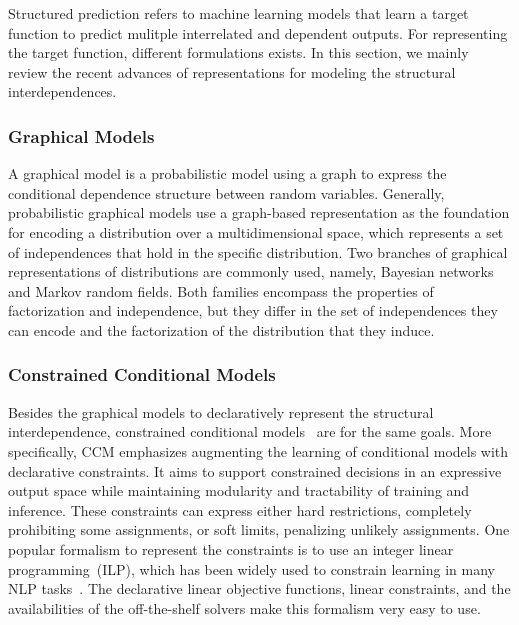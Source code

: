 Structured prediction refers to machine learning models that learn a
target function to predict mulitple interrelated and dependent
outputs. For representing the target function, different formulations
exists. In this section, we mainly review the recent advances of
representations for modeling the structural interdependences.

\subsubsection{Graphical Models}
\label{sssec:bg:graphic-models}
A graphical model is a probabilistic model using a graph to express
the conditional dependence structure between random
variables. Generally, probabilistic graphical models use a graph-based
representation as the foundation for encoding a distribution over a
multidimensional space, which represents a set of independences that
hold in the specific distribution. Two branches of graphical
representations of distributions are commonly used, namely, Bayesian
networks and Markov random fields. Both families encompass the
properties of factorization and independence, but they differ in the
set of independences they can encode and the factorization of the
distribution that they induce.

\subsubsection{Constrained Conditional Models}
\label{sssec:bg:ccm}
Besides the graphical models to declaratively represent the structural
interdependence, constrained conditional
models~\citep[CCM,][]{chang2012structured} are for the same
goals. More specifically, CCM emphasizes augmenting the learning of
conditional models with declarative constraints. It aims to support
constrained decisions in an expressive output space while maintaining
modularity and tractability of training and inference. These
constraints can express either hard restrictions, completely
prohibiting some assignments, or soft limits, penalizing unlikely
assignments. One popular formalism to represent the constraints is to
use an integer linear programming~(ILP), which has been widely used to
constrain learning in many NLP tasks~\citep{roth2007global}. The
declarative linear objective functions, linear constraints, and the
availabilities of the off-the-shelf solvers make this formalism very
easy to use.

